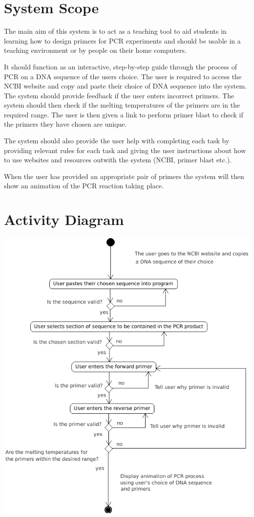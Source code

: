 \documentclass{l3deliverable}
\begin{document}

\section{System Scope}

The main aim of this system is to act as a teaching tool to aid students
in learning how to design primers for PCR experiments and should be
usable in a teaching environment or by people on their home computers.

It should function as an interactive, step-by-step guide through the
process of PCR on a DNA sequence of the users choice. The user is
required to access the NCBI website and copy and paste their choice of
DNA sequence into the system. The system should provide feedback if the
user enters incorrect primers. The system should then check if the
melting temperatures of the primers are in the required range. The user
is then given a link to perform primer blast to check if the primers
they have chosen are unique.

The system should also provide the user help with completing each task
by providing relevant rules for each task and giving the user
instructions about how to use websites and resources outwith the system
(NCBI, primer blast etc.).

When the user has provided an appropriate pair of primers the system
will then show an animation of the PCR reaction taking place.

\section{Activity Diagram}

\includegraphics{PCRActivity.png}
\end{document}
